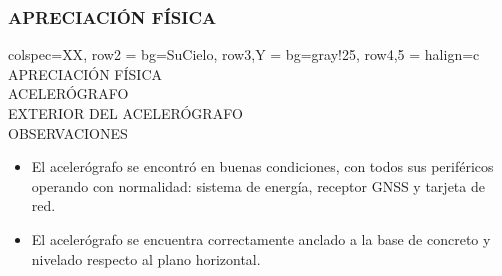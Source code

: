 \subsubsection{APRECIACIÓN FÍSICA}
\begin{tblr}{
        colspec={XX},
        row{2} = {bg=SuCielo},
        row{3,Y} = {bg=gray!25},
        row{4,5} = {halign=c}
    }
     APRECIACIÓN FÍSICA \\
     ACELERÓGRAFO \MakeUppercase{} \\
     EXTERIOR DEL ACELERÓGRAFO \\
     OBSERVACIONES \\
     \begin{itemize}
        \item El acelerógrafo se encontró en buenas condiciones, con todos sus periféricos operando con normalidad: sistema de energía, receptor GNSS y tarjeta de red.
        \item El acelerógrafo se encuentra correctamente anclado a la base de concreto y nivelado respecto al plano horizontal.
    \end{itemize}
\end{tblr}
\newpage
